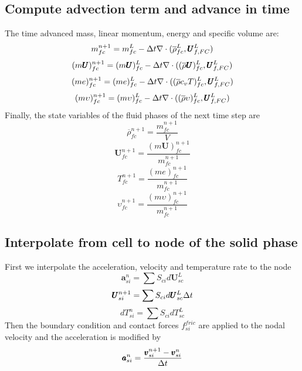 \documentclass[preprint,12pt]{elsarticle}
\begin{document}
\subsection{\textsf{Compute advection term and advance in time}}
The time advanced mass, linear momentum, energy and specific volume are:
%
%
\begin{equation}
 m_{fc}^{n+1} = m_{fc}^L - \Delta{t}  \nabla \cdot (\overline{\rho}_{fc}^L,\pmb{U}_{f,FC}^{L})
\end {equation}
%
%
\begin{equation}
 (m \pmb{U})_{fc}^{n+1} = (m \pmb{U})_{fc}^L - \Delta{t}  \nabla \cdot ((\overline{\rho} \pmb{U})_{fc}^L,\pmb{U}_{f,FC}^{L})
\end {equation}
%
%
\begin{equation}
 (me)_{fc}^{n+1} = (me)_{fc}^L - \Delta{t}  \nabla \cdot ((\overline{\rho} c_v T)_{fc}^L,\pmb{U}_{f,FC}^{L})
\end {equation}
%
%
\begin{equation}
 (m \upsilon)_{fc}^{n+1} = (m \upsilon)_{fc}^L - \Delta{t}  \nabla \cdot ((\overline{\rho} \upsilon)_{fc}^L,\pmb{U}_{f,FC}^{L})
\end {equation}
%
%
Finally, the state variables of the fluid phases of the next time step are
%
%
\begin{equation}
\overline{\rho}_{fc}^{n+1} = \frac{m_{fc}^{n+1}} {V}
\end {equation}
%
%
\begin{equation}
 \pmb{U}_{fc}^{n+1} = \frac{(m \pmb{U})_{fc}^{n+1}}{m_{fc}^{n+1}} 
\end {equation}
%
%
\begin{equation}
 T_{fc}^{n+1} = \frac{(me)_{fc}^{n+1}}{m_{fc}^{n+1}}
\end {equation}
%
%
\begin{equation}
 \upsilon_{fc}^{n+1} = \frac{(m \upsilon)_{fc}^{n+1}}{m_{fc}^{n+1}}
\end {equation}
%
%
\subsection{\textsf{Interpolate from cell to node of the solid phase}}
%
First we interpolate the acceleration, velocity and temperature rate to the node
%
%
\begin{equation}
 \pmb{a}_{si}^n = \sum{S_{ci} d\pmb{U}_{sc}^L}
\end {equation}
%
%
\begin{equation}
 \pmb{U}_{si}^{n+1} = \sum{S_{ci} d\pmb{U}_{sc}^L} \Delta{t}
\end {equation}
%
\begin{equation}
 dT_{si}^n =  \sum{S_{ci} dT_{sc}^L}
\end {equation}
%
%
Then the boundary condition and contact forces $f_{si}^{fric}$ are applied to the nodal velocity and the acceleration is modified by
%
%
\begin{equation}
     \pmb{a}_{si}^n = \frac{\pmb{v}_{si}^{n+1} - \pmb{v}_{si}^n}{\Delta{t}}
\end {equation}
%
%
\end{document}
